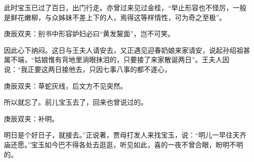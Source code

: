 \begin{parag}
    此时宝玉已过了百日，出门行走。亦曾过来见过金桂，“举止形容也不怪厉，一般是鲜花嫩柳，与众姊妹不差上下的人，焉得这等样情性，可为奇之至极”。\begin{note}庚辰双夹：别书中形容妒妇必曰“黄发黧面”，岂不可笑。\end{note}因此心下纳闷。这日与王夫人请安去，又正遇见迎春奶娘来家请安，说起孙绍祖甚属不端，“姑娘惟有背地里淌眼抹泪的，只要接了来家散诞两日”。王夫人因说：“我正要这两日接他去，只因七事八事的都不遂心，\begin{note}庚辰双夹：草蛇灰线，后文方不见突然。\end{note}所以就忘了。前儿宝玉去了，回来也曾说过的。\begin{note}庚辰双夹：补明。\end{note}明日是个好日子，就接去。”正说著，贾母打发人来找宝玉，说：“明儿一早往天齐庙还愿。”宝玉如今巴不得各处去逛逛，听见如此，喜的一夜不曾合眼，盼明不明的。
\end{parag}


